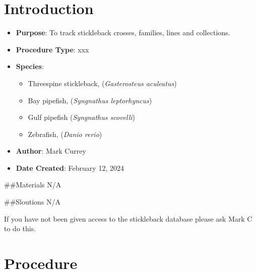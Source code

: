 \documentclass[
  letterpaper,
  DIV=11,
  numbers=noendperiod]{scrreprt}
\providecommand{\tightlist}{%
  \setlength{\itemsep}{0pt}\setlength{\parskip}{0pt}}\usepackage{longtable,booktabs,array}
\begin{document}
\hypertarget{introduction-15}{%
\section{Introduction}\label{introduction-15}}

\begin{itemize}
\tightlist
\item
  \textbf{Purpose}: To track stickleback crosses, families, lines and
  collections.
\item
  \textbf{Procedure Type}: xxx
\item
  \textbf{Species}:

  \begin{itemize}
  \tightlist
  \item
    Threespine stickleback, (\emph{Gasterosteus aculeatus})
  \item
    Bay pipefish, (\emph{Syngnathus leptorhyncus})
  \item
    Gulf pipefish (\emph{Syngnathus scovelli})
  \item
    Zebrafish, (\emph{Danio rerio})
  \end{itemize}
\item
  \textbf{Author}: Mark Currey\\
\item
  \textbf{Date Created}: February 12, 2024
\end{itemize}

\#\#Materials N/A

\#\#Sloutions N/A

\begin{tcolorbox}[enhanced jigsaw, bottomtitle=1mm, rightrule=.15mm, toptitle=1mm, opacitybacktitle=0.6, bottomrule=.15mm, titlerule=0mm, coltitle=black, leftrule=.75mm, arc=.35mm, colback=white, colframe=quarto-callout-warning-color-frame, left=2mm, colbacktitle=quarto-callout-warning-color!10!white, title=\textcolor{quarto-callout-warning-color}{\faExclamationTriangle}\hspace{0.5em}{NOTE}, toprule=.15mm, opacityback=0, breakable]

If you have not been given access to the stickleback database please ask
Mark C to do this.

\end{tcolorbox}

\hypertarget{procedure-15}{%
\section{Procedure}\label{procedure-15}}
\end{document}
